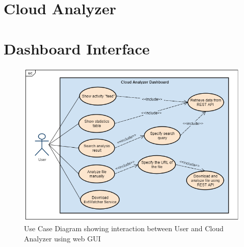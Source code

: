 \section{Cloud Analyzer}
\label{section:cloudApi}


\section{Dashboard Interface}
\label{section:dashboard}

\begin{figure}[H]
	\centerline{\includegraphics[scale=0.7]{figures/usecaseGUI.png}}  
	\caption{Use Case Diagram showing interaction between User and Cloud Analyzer using web GUI}
	\label{usecase}
\end{figure}